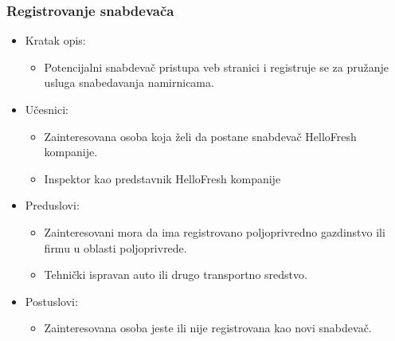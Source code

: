 \subsubsection{Registrovanje snabdevača}

\begin{itemize}
	\item Kratak opis:
		\begin{itemize}
			\item Potencijalni snabdevač pristupa veb stranici i registruje se za pružanje usluga snabedavanja namirnicama.
		\end{itemize}
	\item Učesnici:
		\begin{itemize}
			\item Zainteresovana osoba koja želi da postane snabdevač HelloFresh kompanije.
			\item Inspektor kao predstavnik HelloFresh kompanije
		\end{itemize}				
	\item Preduslovi:
		\begin{itemize}
		    \item Zainteresovani mora da ima registrovano poljoprivredno gazdinstvo ili firmu u oblasti poljoprivrede.
		    \item Tehnički ispravan auto ili drugo transportno sredstvo.
		\end{itemize}
	\item Postuslovi:
		\begin{itemize}
			\item Zainteresovana osoba jeste ili nije registrovana kao novi snabdevač.


\end{itemize}
\end{itemize}
